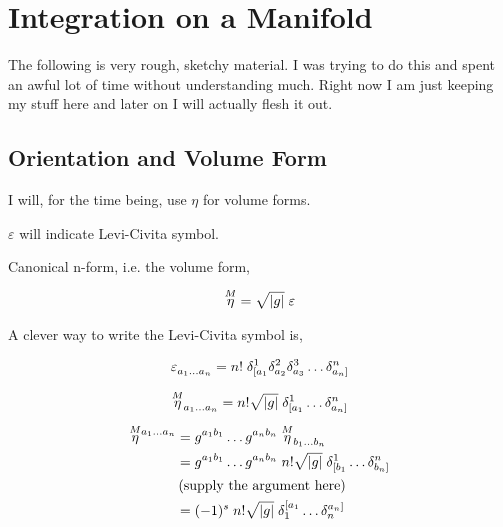 \section{Integration on a Manifold}
The following is very rough, sketchy material. I was trying to do this and spent an awful lot of time without understanding much. Right now I am just keeping my stuff here and later on I will actually flesh it out.

























\subsection{Orientation and Volume Form}

I will, for the time being, use $ \eta$ for volume forms.

$ \varepsilon$ will indicate Levi-Civita symbol.

Canonical n-form, i.e. the volume form,

\begin{align*}
    & \overset{\smash{M}}{\eta} = \sqrt{|g|} \; \varepsilon \\
\end{align*}

A clever way to write the Levi-Civita symbol is,

\begin{align*}
    & \tt{\varepsilon}{}{a_1 \ldots a_n} = n! \; \kron{1}{[a_1} \kron{2}{a_2} \kron{3}{a_3} \ldots \kron{n}{a_n]} \\
\end{align*}

\begin{align*}
    & \tt{\ol{M}{\eta}}{}{a_1 \ldots a_n} = n! \sqrt{|g|} \; \kron{1}{[a_1} \ldots \kron{n}{a_n]} \\
\end{align*}

\begin{align*}
    \tt{\ol{M}{\eta}}{a_1 \ldots a_n}{} &= \tt{g}{a_1 b_1}{} \ldots \tt{g}{a_n b_n}{} \; \tt{\ol{M}{\eta}}{}{b_1 \ldots b_n} \\
    &= \tt{g}{a_1 b_1}{} \ldots \tt{g}{a_n b_n}{} \; n! \sqrt{|g|} \; \kron{1}{[b_1} \ldots \kron{n}{b_n]} \\
    & \lera{ \text{supply the argument here}} \\
    &= (-1)^s \; n! \sqrt{|g|} \; \kron{[a_1}{1} \ldots \kron{a_n]}{n} \\
\end{align*}

